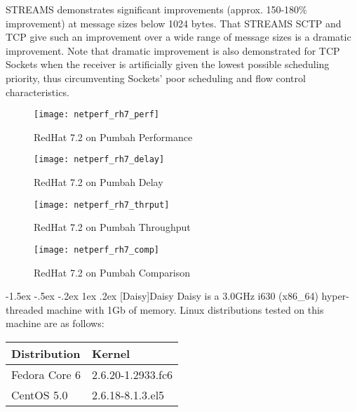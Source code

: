 \documentclass[letterpaper,final,notitlepage,twocolumn,10pt,twoside]{article}
\makeatletter
\renewcommand\subsection{\@startsection{subsection}{2}{\z@}%
                                     {-1.5ex \@plus -.5ex \@minus -.2ex}%
                                     {1ex \@plus .2ex}%
                                     {\normalfont\normalsize\bfseries}}
\makeatother
\begin{document}
\begin{description}
STREAMS demonstrates significant improvements (approx. 150-180\% improvement) at message sizes below
1024 bytes.  That STREAMS SCTP and TCP give such an improvement over a wide range of message sizes
is a dramatic improvement.  Note that dramatic improvement is also demonstrated for TCP Sockets when
the receiver is artificially given the lowest possible scheduling priority, thus circumventing
Sockets' poor scheduling and flow control characteristics.

\end{description}

\begin{figure}[p]
\center\texttt{[image: netperf\_rh7\_perf]}
\caption[RedHat 7.2 on Pumbah Performance]{RedHat 7.2 on Pumbah Performance}
\label{figure:rh7perf}
\end{figure}

\begin{figure}[p]
\center\texttt{[image: netperf\_rh7\_delay]}
\caption[RedHat 7.2 on Pumbah Delay]{RedHat 7.2 on Pumbah Delay}
\label{figure:rh7dly}
\end{figure}

\begin{figure}[p]
\center\texttt{[image: netperf\_rh7\_thrput]}
\caption[RedHat 7.2 on Pumbah Throughput]{RedHat 7.2 on Pumbah Throughput}
\label{figure:rh7thrput}
\end{figure}

\begin{figure}[pt]
\center\texttt{[image: netperf\_rh7\_comp]}
\caption[RedHat 7.2 on Pumbah Comparison]{RedHat 7.2 on Pumbah Comparison}
\label{figure:rh7comp}
\end{figure}

\subsection[Daisy]{Daisy}
Daisy is a 3.0GHz i630 (x86\_64) hyper-threaded machine with 1Gb of memory.
Linux distributions tested on this machine are as follows:

\small
\setlength{\tabcolsep}{0.4em}
\setlength{\arraycolsep}{0.4em}
\begin{tabular}{ll}\\
Distribution & Kernel\\
\hline
Fedora Core 6 & 2.6.20-1.2933.fc6\\
CentOS 5.0 & 2.6.18-8.1.3.el5\\
\end{tabular}\\[1.0ex]
\normalsize
\end{document}
